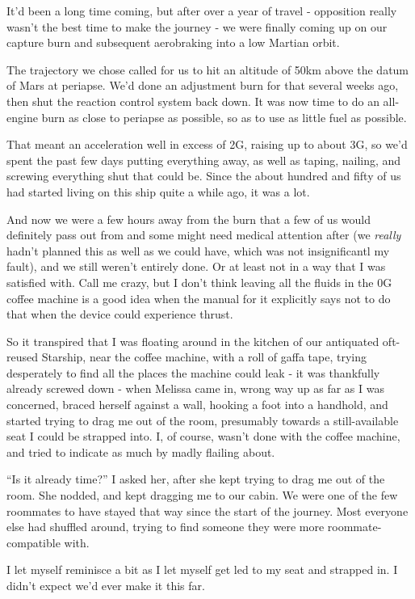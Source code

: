 It'd been a long time coming, but after over a year of travel - opposition
really wasn't the best time to make the journey - we were finally
coming up on our capture burn and subsequent aerobraking into a low Martian
orbit.

The trajectory we chose called for us to hit an altitude of 50km above
the datum of Mars at periapse. We'd done an adjustment burn for that several
weeks ago, then shut the reaction control system back down. It was now time to
do an all-engine burn as close to periapse as possible, so as to use as little
fuel as possible.

That meant an acceleration well in excess of 2G, raising up to
about 3G, so we'd spent the past few days putting everything away, as well as
taping, nailing, and screwing everything shut that could be. Since the about
hundred and fifty of us had started living on this ship quite a while ago, it
was a lot.

And now we were a few hours away from the burn that a few of us would
definitely pass out from and some might need medical attention after (we
\textit{really} hadn't planned this as well as we could have, which was not
insignificantl my fault), and we still weren't entirely done. Or at least not in
a way that I was satisfied with. Call me crazy, but I don't think leaving all
the fluids in the 0G coffee machine is a good idea when the manual for it
explicitly says not to do that when the device could experience thrust.

So it transpired that I was floating around in the kitchen of our antiquated
oft-reused Starship, near the coffee machine, with a roll of gaffa tape, trying
desperately to find all the places the machine could leak - it was thankfully
already screwed down - when Melissa came in, wrong way up as far as I was
concerned, braced herself against a wall, hooking a foot into a handhold, and
started trying to drag me out of the room, presumably towards a still-available
seat I could be strapped into. I, of course, wasn't done with the coffee
machine, and tried to indicate as much by madly flailing about.

``Is it already time?'' I asked her, after she kept trying to drag me out of the
room. She nodded, and kept dragging me to our cabin. We were one of the few
roommates to have stayed that way since the start of the journey. Most everyone
else had shuffled around, trying to find someone they were more
roommate-compatible with.

I let myself reminisce a bit as I let myself get led to my seat and strapped in.
I didn't expect we'd ever make it this far.

